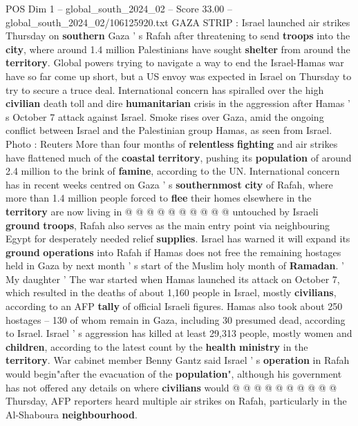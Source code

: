 \begin{textsample}{POS Dim 1 – global\_south\_2024\_02 – Score 33.00 – global\_south\_2024\_02/106125920.txt}  \label{ex:f1_pos_025}
GAZA STRIP : Israel launched air strikes Thursday on \textbf{southern} Gaza ' s Rafah after threatening to send \textbf{troops} into the \textbf{city}, where around 1.4 million Palestinians have sought \textbf{shelter} from around the \textbf{territory}.
Global powers trying to navigate a way to end the Israel-Hamas war have so far come up short, but a US envoy was expected in Israel on Thursday to try to secure a truce deal.
International concern has spiralled over the high \textbf{civilian} death toll and dire \textbf{humanitarian} crisis in the aggression after Hamas ' s October 7 attack against Israel.
Smoke rises over Gaza, amid the ongoing conflict between Israel and the Palestinian group Hamas, as seen from Israel.
Photo : Reuters More than four months of \textbf{relentless} \textbf{fighting} and air strikes have flattened much of the \textbf{coastal} \textbf{territory}, pushing its \textbf{population} of around 2.4 million to the brink of \textbf{famine}, according to the UN.
International concern has in recent weeks centred on Gaza ' s \textbf{southernmost} \textbf{city} of Rafah, where more than 1.4 million people forced to \textbf{flee} their homes elsewhere in the \textbf{territory} are now living in @ @ @ @ @ @ @ @ @ @ untouched by Israeli \textbf{ground} \textbf{troops}, Rafah also serves as the main entry point via neighbouring Egypt for desperately needed relief \textbf{supplies}.
Israel has warned it will expand its \textbf{ground} \textbf{operations} into Rafah if Hamas does not free the remaining hostages held in Gaza by next month ' s start of the Muslim holy month of \textbf{Ramadan}. ' My daughter ' The war started when Hamas launched its attack on October 7, which resulted in the deaths of about 1,160 people in Israel, mostly \textbf{civilians}, according to an AFP \textbf{tally} of official Israeli figures.
Hamas also took about 250 hostages -- 130 of whom remain in Gaza, including 30 presumed dead, according to Israel.
Israel ' s aggression has killed at least 29,313 people, mostly women and \textbf{children}, according to the latest count by the \textbf{health} \textbf{ministry} in the \textbf{territory}.
War cabinet member Benny Gantz said Israel ' s \textbf{operation} in Rafah would begin"after the evacuation of the \textbf{population}", although his government has not offered any details on where \textbf{civilians} would @ @ @ @ @ @ @ @ @ @ Thursday, AFP reporters heard multiple air strikes on Rafah, particularly in the Al-Shaboura \textbf{neighbourhood}.

\end{textsample}

